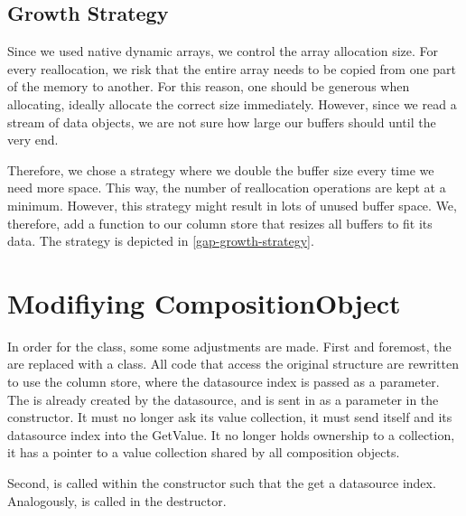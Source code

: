 \subsection{Growth Strategy}
\label{sub:Growth Strategy}
Since we used native dynamic arrays, we control the array allocation size. For every reallocation, we risk that the entire array needs to be copied from one part of the memory to another. For this reason, one should be generous when allocating, ideally allocate the correct size immediately. However, since we read a stream of data objects, we are not sure how large our buffers should until the very end. 

Therefore, we chose a strategy where we double the buffer size every time we need more space. This way, the number of reallocation operations are kept at a minimum. However, this strategy might result in lots of unused buffer space. We, therefore, add a  function to our column store that resizes all buffers to fit its data. The strategy is depicted in \ref{gap-growth-strategy}.

\section{Modifiying CompositionObject}
\label{sec:Modifiying CompositionObject}
In order for the  class, some some adjustments are made. First and foremost, the  are replaced with a  class. All code that access the original structure are rewritten to use the column store, where the datasource index is passed as a parameter. The  is already created by the datasource, and is sent in as a parameter in the constructor. It must no longer ask its value collection, it must send itself and its datasource index into the GetValue. It no longer holds ownership to a collection, it has a pointer to a value collection shared by all composition objects.

Second,  is called within the constructor such that the  get a datasource index. Analogously,  is called in the destructor.

